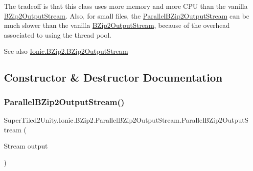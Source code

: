 The tradeoff is that this class uses more memory and more C\+PU than the vanilla {\ttfamily \mbox{\hyperlink{class_super_tiled2_unity_1_1_ionic_1_1_b_zip2_1_1_b_zip2_output_stream}{B\+Zip2\+Output\+Stream}}}. Also, for small files, the {\ttfamily \mbox{\hyperlink{class_super_tiled2_unity_1_1_ionic_1_1_b_zip2_1_1_parallel_b_zip2_output_stream}{Parallel\+B\+Zip2\+Output\+Stream}}} can be much slower than the vanilla {\ttfamily \mbox{\hyperlink{class_super_tiled2_unity_1_1_ionic_1_1_b_zip2_1_1_b_zip2_output_stream}{B\+Zip2\+Output\+Stream}}}, because of the overhead associated to using the thread pool. 

\begin{DoxySeeAlso}{See also}
\mbox{\hyperlink{class_super_tiled2_unity_1_1_ionic_1_1_b_zip2_1_1_b_zip2_output_stream}{Ionic.\+B\+Zip2.\+B\+Zip2\+Output\+Stream}}


\end{DoxySeeAlso}


\subsection{Constructor \& Destructor Documentation}
\mbox{\label{class_super_tiled2_unity_1_1_ionic_1_1_b_zip2_1_1_parallel_b_zip2_output_stream_aa371304363b2690c38f3afb52a3f64f1}} 
\subsubsection{\texorpdfstring{Parallel\+B\+Zip2\+Output\+Stream()}{ParallelBZip2OutputStream()}\hspace{0.1cm}{\footnotesize\ttfamily [1/4]}}
{\footnotesize\ttfamily Super\+Tiled2\+Unity.\+Ionic.\+B\+Zip2.\+Parallel\+B\+Zip2\+Output\+Stream.\+Parallel\+B\+Zip2\+Output\+Stream (\begin{DoxyParamCaption}\item[{Stream}]{output }\end{DoxyParamCaption})}



